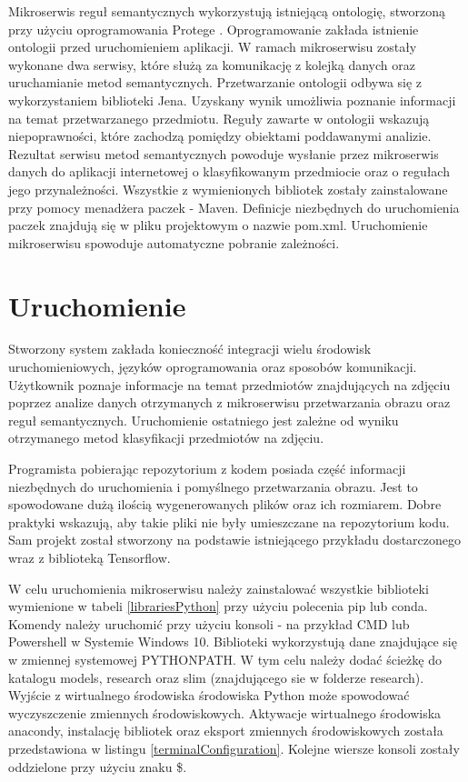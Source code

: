 Mikroserwis reguł semantycznych wykorzystują istniejącą ontologię, stworzoną przy użyciu oprogramowania Protege \cite{Protege}. Oprogramowanie zakłada istnienie ontologii przed uruchomieniem aplikacji. W ramach mikroserwisu zostały wykonane dwa serwisy, które służą za komunikację z kolejką danych oraz uruchamianie metod semantycznych. Przetwarzanie ontologii odbywa się z wykorzystaniem biblioteki Jena. Uzyskany wynik umożliwia poznanie informacji na temat przetwarzanego przedmiotu. Reguły zawarte w ontologii wskazują niepoprawności, które zachodzą pomiędzy obiektami poddawanymi analizie. Rezultat serwisu metod semantycznych powoduje wysłanie przez mikroserwis danych do aplikacji internetowej o klasyfikowanym przedmiocie oraz o regułach jego przynależności. 
Wszystkie z wymienionych bibliotek zostały zainstalowane przy pomocy menadżera paczek - Maven. Definicje niezbędnych do uruchomienia paczek znajdują się w pliku projektowym o nazwie pom.xml. Uruchomienie mikroserwisu spowoduje automatyczne pobranie zależności.


\section{Uruchomienie}

Stworzony system zakłada konieczność integracji wielu środowisk uruchomieniowych, języków oprogramowania oraz sposobów komunikacji. Użytkownik poznaje informacje na temat przedmiotów znajdujących na zdjęciu poprzez analize danych otrzymanych z mikroserwisu przetwarzania obrazu oraz reguł semantycznych. Uruchomienie ostatniego jest zależne od wyniku otrzymanego metod klasyfikacji przedmiotów na zdjęciu. 

Programista pobierając repozytorium z kodem posiada część informacji niezbędnych do uruchomienia i pomyślnego przetwarzania obrazu. Jest to spowodowane dużą ilością wygenerowanych plików oraz ich rozmiarem. Dobre praktyki wskazują, aby takie pliki nie były umieszczane na repozytorium kodu. Sam projekt został stworzony na podstawie istniejącego przykładu dostarczonego wraz z biblioteką Tensorflow. 

W celu uruchomienia mikroserwisu należy zainstalować wszystkie biblioteki wymienione w tabeli \ref{librariesPython} przy użyciu polecenia pip lub conda. Komendy należy uruchomić przy użyciu konsoli - na przykład CMD lub Powershell\cite{Powershell} w Systemie Windows 10. Biblioteki wykorzystują dane znajdujące się w zmiennej systemowej PYTHONPATH. W tym celu należy dodać ścieżkę do katalogu models, research oraz slim (znajdującego sie w folderze research). Wyjście z wirtualnego środowiska środowiska Python może spowodować wyczyszczenie zmiennych środowiskowych. Aktywacje wirtualnego środowiska anacondy, instalację bibliotek oraz eksport zmiennych środowiskowych została przedstawiona w listingu \ref{terminalConfiguration}. Kolejne wiersze konsoli zostały oddzielone przy użyciu znaku \$.


